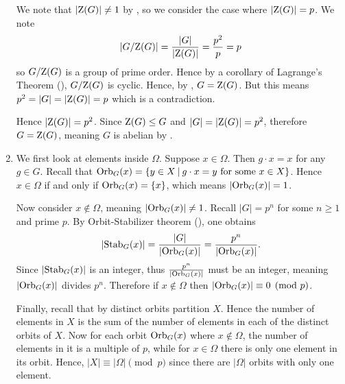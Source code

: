 \begin{enumerate}
    We note that $|\mathrm{Z}(G)| \neq 1$ by , so we consider the case where $|\mathrm{Z}(G)| = p$. We note
    \[
        |G/\mathrm{Z}(G)| = \frac{|G|}{|\mathrm{Z}(G)|} = \frac{p^2}{p} = p
    \]
    so $G/\mathrm{Z}(G)$ is a group of prime order. Hence by a corollary of Lagrange's Theorem (), $G/\mathrm{Z}(G)$ is cyclic. Hence, by , $G = \mathrm{Z}(G)$. But this means $p^2 = |G| = |\mathrm{Z}(G)| = p$ which is a contradiction.

    Hence $|\mathrm{Z}(G)| = p^2$. Since $\mathrm{Z}(G) \leq G$ and $|G| = |\mathrm{Z}(G)| = p^2$, therefore $G = \mathrm{Z}(G)$, meaning $G$ is abelian by .

    \item We first look at elements inside $\Omega$. Suppose $x \in \Omega$. Then $g \cdot x = x$ for any $g \in G$. Recall that $\Orb{G}{x} = \{y \in X \vert g \cdot x = y \text{ for some } x \in X\}$. Hence $x \in \Omega$ if and only if $\mathrm{Orb}_{G}(x) = \{x\}$, which means $|\mathrm{Orb}_{G}(x)| = 1$.
    
    Now consider $x \notin \Omega$, meaning $|\mathrm{Orb}_{G}(x)| \neq 1$. Recall $|G| = p^n$ for some $n \geq 1$ and prime $p$. By Orbit-Stabilizer theorem (), one obtains
    \[
        |\mathrm{Stab}_{G}(x)| = \frac{|G|}{|\mathrm{Orb}_{G}(x)|} = \frac{p^n}{|\mathrm{Orb}_{G}(x)|}.
    \]
    Since $|\mathrm{Stab}_{G}(x)|$ is an integer, thus $\frac{p^n}{|\mathrm{Orb}_{G}(x)|}$ must be an integer, meaning $|\mathrm{Orb}_{G}(x)|$ divides $p^n$. Therefore if $x \notin \Omega$ then $|\mathrm{Orb}_{G}(x)| \equiv 0 \pmod p$.
    
    Finally, recall that by  distinct orbits partition $X$. Hence the number of elements in $X$ is the sum of the number of elements in each of the distinct orbits of $X$. Now for each orbit $\mathrm{Orb}_{G}(x)$ where $x \notin \Omega$, the number of elements in it is a multiple of $p$, while for $x \in \Omega$ there is only one element in its orbit. Hence, $|X| \equiv |\Omega| \pmod p$ since there are $|\Omega|$ orbits with only one element.
\end{enumerate}

